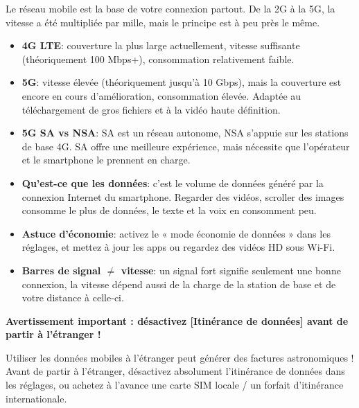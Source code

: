 
Le réseau mobile est la base de votre connexion partout. De la 2G à la 5G, la vitesse a été multipliée par mille, mais le principe est à peu près le même.


\begin{itemize}
  \item \textbf{4G LTE}: couverture la plus large actuellement, vitesse suffisante (théoriquement 100 Mbps+), consommation relativement faible.
  \item \textbf{5G}: vitesse élevée (théoriquement jusqu'à 10 Gbps), mais la couverture est encore en cours d'amélioration, consommation élevée. Adaptée au téléchargement de gros fichiers et à la vidéo haute définition.
  \item \textbf{5G SA vs NSA}: SA est un réseau autonome, NSA s'appuie sur les stations de base 4G. SA offre une meilleure expérience, mais nécessite que l'opérateur et le smartphone le prennent en charge.
\end{itemize}


\begin{itemize}
  \item \textbf{Qu'est-ce que les données}: c'est le volume de données généré par la connexion Internet du smartphone. Regarder des vidéos, scroller des images consomme le plus de données, le texte et la voix en consomment peu.
  \item \textbf{Astuce d'économie}: activez le « mode économie de données » dans les réglages, et mettez à jour les apps ou regardez des vidéos HD sous Wi-Fi.
  \item \textbf{Barres de signal $\neq$ vitesse}: un signal fort signifie seulement une bonne connexion, la vitesse dépend aussi de la charge de la station de base et de votre distance à celle-ci.
\end{itemize}

\textbf{Avertissement important : désactivez [Itinérance de données] avant de partir à l'étranger !}\par

Utiliser les données mobiles à l'étranger peut générer des factures astronomiques ! Avant de partir à l'étranger, désactivez absolument l'itinérance de données dans les réglages, ou achetez à l'avance une carte SIM locale / un forfait d'itinérance internationale.

